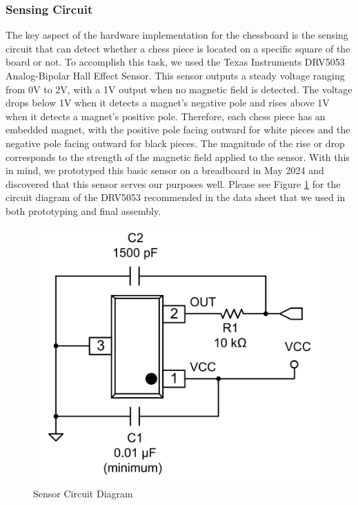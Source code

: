 \documentclass[11pt,journal]{IEEEtran}
\begin{document}
\subsubsection{Sensing Circuit}
The key aspect of the hardware implementation for the chessboard is the sensing circuit that can detect whether a chess piece is located on a specific square of the board or not. To accomplish this task, we used the Texas Instruments DRV5053 Analog-Bipolar Hall Effect Sensor. This sensor outputs a steady voltage ranging from 0V to 2V, with a 1V output when no magnetic field is detected. The voltage drops below 1V when it detects a magnet's negative pole and rises above 1V when it detects a magnet's positive pole. Therefore, each chess piece has an embedded magnet, with the positive pole facing outward for white pieces and the negative pole facing outward for black pieces. The magnitude of the rise or drop corresponds to the strength of the magnetic field applied to the sensor. With this in mind, we prototyped this basic sensor on a breadboard in May 2024 and discovered that this sensor serves our purposes well. Please see Figure \ref{sensorcircuit} for the circuit diagram of the DRV5053 recommended in the data sheet that we used in both prototyping and final assembly.
\begin{figure}[ht]
  \includegraphics[width=\linewidth]{SensorCircuit.png}
  \caption{Sensor Circuit Diagram}
  \label{sensorcircuit}
\end{figure}
\end{document}
